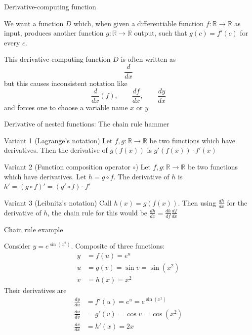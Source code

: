 \documentclass[12pt,aspectratio=169,handout]{beamer}
\begin{document}
\begin{frame}{Derivative-computing function}
	
	We want a function $D$ which, when given a differentiable function $f : \mathbb{R} \to \mathbb{R}$ as input, produces another function $g : \mathbb{R} \to \mathbb{R}$ output, such that $g(c) = f'(c)$ for every $c$.
	
	\bigskip
	\pause
	This derivative-computing function $D$ is often written as 
	$$\frac{d}{dx}$$
	but this causes inconsistent notation like
	$$\frac{d}{dx}(f), \qquad \frac{df}{dx}, \qquad \frac{dy}{dx}$$
	and forces one to choose a variable name $x$ or $y$
	
\end{frame}

\begin{frame}{Derivative of nested functions: The chain rule hammer}
	
	
	\begin{block}{Variant 1 (Lagrange's notation)}
		Let $f, g : \mathbb{R} \to \mathbb{R}$ be two functions which have derivatives. Then the derivative of $g (f(x))$ is $g' (f(x)) \cdot f' (x)$
	\end{block}
	\pause
	
	\begin{block}{Variant 2 (Function composition operator $\circ$)}
		Let $f, g : \mathbb{R} \to \mathbb{R}$ be two functions which have derivatives. Let $h = g \circ f$. The derivative of $h$ is $h'=(g \circ f)'=(g'\circ f)\cdot f'$
	\end{block}
	\pause
	
	\begin{block}{Variant 3 (Leibnitz's notation)}
		Call $h(x) = g(f(x))$. Then using $\frac{dh}{dx}$ for the derivative of $h$, the chain rule for this would be $\frac{dh}{dx} = \frac{dh}{df} \frac{df}{dx}$
	\end{block}
	
\end{frame}


\begin{frame}{Chain rule example}
	
	Consider $y=e^{\sin(x^{2})}$. Composite of three functions:
	$$
	\begin{aligned}
		y &= f(u) = e^u \\
		u &= g(v) = \sin v = \sin (x^2) \\
		v &= h(x) = x^2
	\end{aligned}
	$$
	\pause
	Their derivatives are
	$$
	\begin{aligned}
		\frac{dy}{du} &= f'(u) = e^u = e^{\sin(x^{2})} \\
		\frac{du}{dv} &= g'(v) = \cos v = \cos (x^2) \\
		\frac{dv}{dx} &= h'(x) = 2x
	\end{aligned}
	$$
\end{frame}
\end{document}
